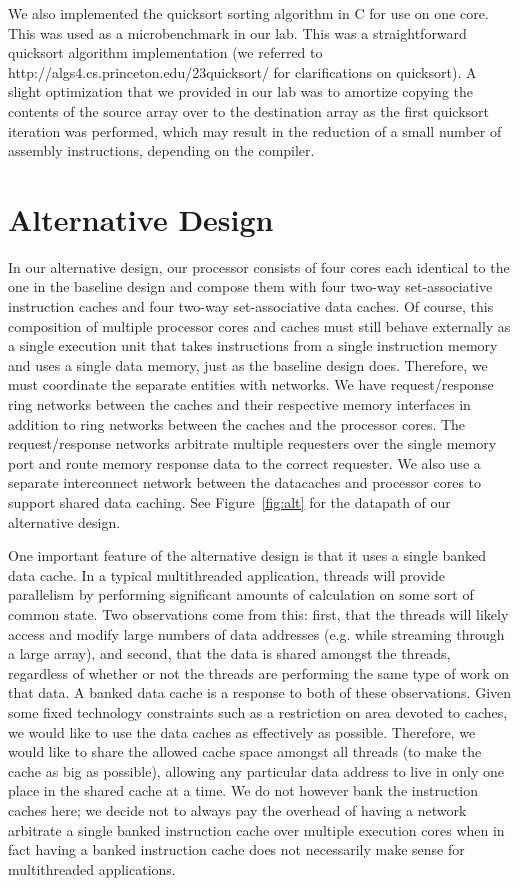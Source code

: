 \documentclass[10pt]{article}
\begin{document}
We also implemented the quicksort sorting algorithm in C for use on one core. This was used as a microbenchmark in our lab. This was a straightforward quicksort algorithm implementation (we referred to http://algs4.cs.princeton.edu/23quicksort/ for clarifications on quicksort). A slight optimization that we provided in our lab was to amortize copying the contents of the source array over to the destination array as the first quicksort iteration was performed, which may result in the reduction of a small number of assembly instructions, depending on the compiler.



\section{Alternative Design}

In our alternative design, our processor consists of four cores each identical to the one in the baseline design and compose them with four two-way set-associative instruction caches and four two-way set-associative data caches. Of course, this composition of multiple processor cores and caches must still behave externally as a single execution unit that takes instructions from a single instruction memory and uses a single data memory, just as the baseline design does. Therefore, we must coordinate the separate entities with networks. We have request/response ring networks between the caches and their respective memory interfaces in addition to ring networks between the caches and the processor cores. The request/response networks arbitrate multiple requesters over the single memory port and route memory response data to the correct requester. We also use a separate interconnect network between the datacaches and processor cores to support shared data caching. See Figure~\ref{fig:alt} for the datapath of our alternative design.

One important feature of the alternative design is that it uses a single banked data cache. In a typical multithreaded application, threads will provide parallelism by performing significant amounts of calculation on some sort of common state. Two observations come from this: first, that the threads will likely access and modify large numbers of data addresses (e.g. while streaming through a large array), and second, that the data is shared amongst the threads, regardless of whether or not the threads are performing the same type of work on that data. A banked data cache is a response to both of these observations. Given some fixed technology constraints such as a restriction on area devoted to caches, we would like to use the data caches as effectively as possible. Therefore, we would like to share the allowed cache space amongst all threads (to make the cache as big as possible), allowing any particular data address to live in only one place in the shared cache at a time. We do not however bank the instruction caches here; we decide not to always pay the overhead of having a network arbitrate a single banked instruction cache over multiple execution cores when in fact having a banked instruction cache does not necessarily make sense for multithreaded applications.
\end{document}

